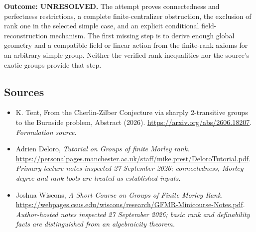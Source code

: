\documentclass[11pt]{article}
\begin{document}
\textbf{Outcome: UNRESOLVED.} The attempt proves connectedness and
perfectness restrictions, a complete finite-centralizer obstruction,
the exclusion of rank one in the selected simple case, and an explicit
conditional field-reconstruction mechanism. The first missing step is
to derive enough global geometry and a compatible field or linear
action from the finite-rank axioms for an arbitrary simple group.
Neither the verified rank inequalities nor the source's exotic groups
provide that step.

\subsection{Sources}
\begin{itemize}
\item[S1]K. Tent, From the Cherlin-Zilber Conjecture via sharply 2-transitive groups to the Burnside problem, Abstract (2026).
\url{https://arxiv.org/abs/2606.18207}.
\textit{Formulation source.}
\item[E1]Adrien Deloro, \emph{Tutorial on Groups of finite Morley rank}.
\url{https://personalpages.manchester.ac.uk/staff/mike.prest/DeloroTutorial.pdf}.
\textit{Primary lecture notes inspected 27 September 2026; connectedness,
Morley degree and rank tools are treated as established inputs.}
\item[E2]Joshua Wiscons, \emph{A Short Course on Groups of Finite Morley Rank}.
\url{https://webpages.csus.edu/wiscons/research/GFMR-Minicourse-Notes.pdf}.
\textit{Author-hosted notes inspected 27 September 2026; basic rank and
definability facts are distinguished from an algebraicity theorem.}
\end{itemize}
\end{document}
